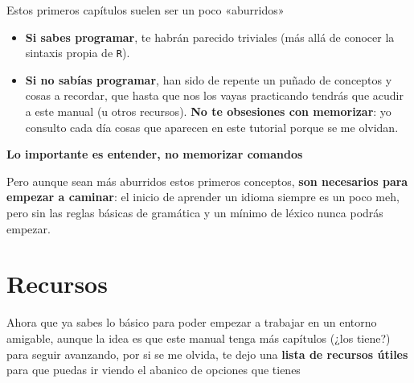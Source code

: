 \documentclass[11pt,]{book}
\providecommand{\tightlist}{%
  \setlength{\itemsep}{0pt}\setlength{\parskip}{0pt}}
\begin{document}
Estos primeros capítulos suelen ser un poco «aburridos»

\begin{itemize}
\tightlist
\item
  \textbf{Si sabes programar}, te habrán parecido triviales (más allá de conocer la sintaxis propia de \texttt{R}).
\item
  \textbf{Si no sabías programar}, han sido de repente un puñado de conceptos y cosas a recordar, que hasta que nos los vayas practicando tendrás que acudir a este manual (u otros recursos). \textbf{No te obsesiones con memorizar}: yo consulto cada día cosas que aparecen en este tutorial porque se me olvidan.
\end{itemize}

\textbf{Lo importante es entender, no memorizar comandos}

Pero aunque sean más aburridos estos primeros conceptos, \textbf{son necesarios para empezar a caminar}: el inicio de aprender un idioma siempre es un poco meh, pero sin las reglas básicas de gramática y un mínimo de léxico nunca podrás empezar.

\hypertarget{recursos}{%
\section{Recursos}\label{recursos}}

Ahora que ya sabes lo básico para poder empezar a trabajar en un entorno amigable, aunque la idea es que este manual tenga más capítulos (¿los tiene?) para seguir avanzando, por si se me olvida, te dejo una \textbf{lista de recursos útiles} para que puedas ir viendo el abanico de opciones que tienes
\end{document}
